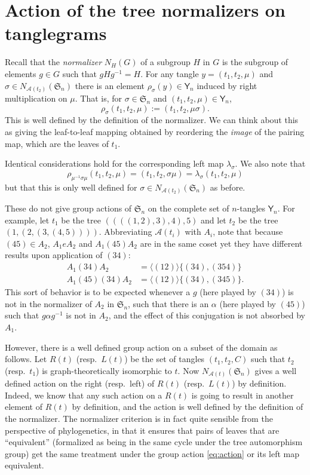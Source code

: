 \documentclass{amsart}
\newcommand{\fS}{\mathfrak S}
\newcommand{\aut}{\mathcal A}
\newcommand{\pairing}{\mu}
\newcommand{\tangle}{\mathsf{Y}}
\begin{document}
\section{Action of the tree normalizers on tanglegrams}
Recall that the \emph{normalizer} $N_H(G)$ of a subgroup $H$ in $G$ is the subgroup of elements $g \in G$ such that $gHg^{-1} = H$.
For any tangle $y = (t_1, t_2, \pairing)$ and $\sigma \in N_{\aut(t_2)}(\fS_n)$ there is an element $\rho_\sigma(y) \in \tangle_n$ induced by right multiplication on $\pairing$.
That is, for $\sigma \in \fS_n$ and $(t_1, t_2, \pairing) \in \tangle_n$,
\begin{equation}
\label{eq:action}
\rho_\sigma (t_1, t_2, \pairing) := (t_1, t_2, \pairing \sigma).
\end{equation}
This is well defined by the definition of the normalizer.
We can think about this as giving the leaf-to-leaf mapping obtained by reordering the \emph{image} of the pairing map, which are the leaves of $t_1$.

Identical considerations hold for the corresponding left map $\lambda_\sigma$.
We also note that
\[
\rho_{\pairing^{-1} \sigma \pairing} (t_1, t_2, \pairing) =
(t_1, t_2, \sigma \pairing) =
\lambda_{\sigma} (t_1, t_2, \pairing)
\]
but that this is only well defined for $\sigma \in N_{\aut(t_2)}(\fS_n)$ as before.

These do not give group actions of $\fS_n$ on the complete set of $n$-tangles $\tangle_n$.
For example, let $t_1$ be the tree $((((1,2),3),4),5)$ and let $t_2$ be the tree $(1,(2,(3,(4,5))))$.
Abbreviating $\aut(t_i)$ with $A_i$, note that because $(4 5) \in A_2$, $A_1 e A_2$ and $A_1 (4 5) A_2$ are in the same coset yet they have different results upon application of $(3 4)$:
\begin{align*}
A_1 (3 4) A_2 & = \langle (1 2) \rangle \{(3 4), (3 5 4)\} \\
A_1 (4 5) (3 4) A_2 & = \langle (1 2) \rangle \{(3 4), (3 4 5)\}.
\end{align*}
This sort of behavior is to be expected whenever a $g$ (here played by $(3 4)$) is not in the normalizer of $A_2$ in $\fS_n$, such that there is an $\alpha$ (here played by $(4 5)$) such that $g \alpha g^{-1}$ is not in $A_2$, and the effect of this conjugation is not absorbed by $A_1$.

However, there is a well defined group action on a subset of the domain as follows.
Let $R(t)$ (resp.\ $L(t)$) be the set of tangles $(t_1, t_2, C)$ such that $t_2$ (resp.\ $t_1$) is graph-theoretically isomorphic to $t$.
Now $N_{\aut(t)}(\fS_n)$ gives a well defined action on the right (resp.\ left) of $R(t)$ (resp.\ $L(t)$) by definition.
Indeed, we know that any such action on a $R(t)$ is going to result in another element of $R(t)$ by definition, and the action is well defined by the definition of the normalizer.
The normalizer criterion is in fact quite sensible from the perspective of phylogenetics, in that it ensures that pairs of leaves that are ``equivalent'' (formalized as being in the same cycle under the tree automorphism group) get the same treatment under the group action \eqref{eq:action} or its left map equivalent.
\end{document}
